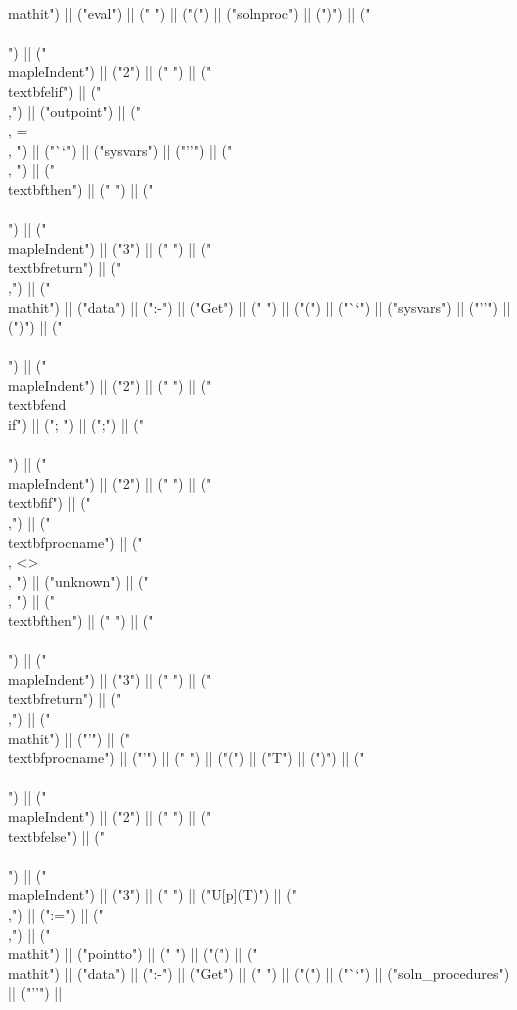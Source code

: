 \documentclass{article}
\begin{document}
\begin{center}
\begin{maplelatex}
{\\mathit{") || ("eval") || ("} ") || ("(") || ("solnproc") || (")") || ("\\\\\n") || ("\\mapleIndent{") || ("2") || ("} ") || ("\\textbf{elif}") || (" \\,") || ("outpoint") || (" \\, = \\, ") || ("``") || ("sysvars") || ("''") || (" \\, ") || ("\\textbf{then}") || (" ") || ("\\\\\n") || ("\\mapleIndent{") || ("3") || ("} ") || ("\\textbf{return}") || ("\\,") || ("\\mathit{") || ("data") || (":-") || ("Get") || ("} ") || ("(") || ("``") || ("sysvars") || ("''") || (")") || ("\\\\\n") || ("\\mapleIndent{") || ("2") || ("} ") || ("\\textbf{end\\ if}") || ("; ") || (";") || ("\\\\\n") || ("\\mapleIndent{") || ("2") || ("} ") || ("\\textbf{if}") || (" \\,") || ("\\textbf{procname}") || (" \\, <> \\, ") || ("unknown") || (" \\, ") || ("\\textbf{then}") || (" ") || ("\\\\\n") || ("\\mapleIndent{") || ("3") || ("} ") || ("\\textbf{return}") || ("\\,") || ("\\mathit{") || ("'") || ("\\textbf{procname}") || ("'") || ("} ") || ("(") || ("T") || (")") || ("\\\\\n") || ("\\mapleIndent{") || ("2") || ("} ") || ("\\textbf{else}") || ("\\\\\n") || ("\\mapleIndent{") || ("3") || ("} ") || ("U[p](T)") || ("\\,") || (":=") || ("\\,") || ("\\mathit{") || ("pointto") || ("} ") || ("(") || ("\\mathit{") || ("data") || (":-") || ("Get") || ("} ") || ("(") || ("``") || ("soln_procedures") || ("''") || }
\end{maplelatex}
\end{center}
\end{document}
